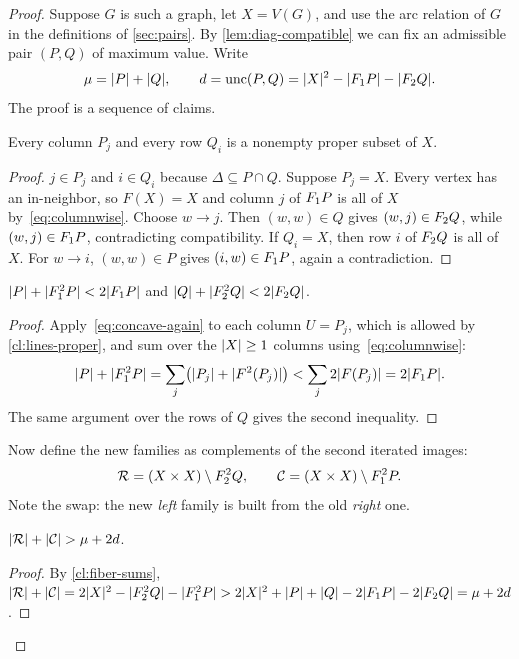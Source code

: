 \begin{proof}
Suppose $G$ is such a graph, let $X=V(G)$, and use the arc relation of $G$ in
the definitions of \cref{sec:pairs}. By \cref{lem:diag-compatible} we can fix
an admissible pair $(P,Q)$ of maximum value. Write
\[
 \mu=\lvert P\rvert+\lvert Q\rvert,\qquad d=\operatorname{unc}(P,Q)=\lvert X\rvert^2-\lvert F_1 P\rvert-\lvert F_2 Q\rvert.
\]
The proof is a sequence of claims.

\begin{claim}\label{cl:lines-proper}
Every column $P_j$ and every row $Q_i$ is a nonempty proper subset of $X$.
\end{claim}

\begin{proof}
$j\in P_j$ and $i\in Q_i$ because $\Delta\subseteq P\cap Q$. Suppose $P_j=X$. Every
vertex has an in-neighbor, so $F(X)=X$ and column $j$ of $F_1 P$ is all of
$X$ by~\eqref{eq:columnwise}. Choose $w\to j$. Then $(w,w)\in Q$ gives
$(w,j)\in F_2 Q$, while $(w,j)\in F_1 P$, contradicting compatibility. If $Q_i=X$, then
row $i$ of $F_2 Q$ is all of $X$. For $w\to i$, $(w,w)\in P$ gives $(i,w)\in F_1 P$, again a
contradiction.
\end{proof}

\begin{claim}\label{cl:fiber-sums}
$\lvert P\rvert+\lvert F_1^2P\rvert<2\lvert F_1 P\rvert$ and $\lvert Q\rvert+\lvert F_2^2Q\rvert<2\lvert F_2 Q\rvert$.
\end{claim}

\begin{proof}
Apply~\eqref{eq:concave-again} to each column $U=P_j$, which is allowed by
\cref{cl:lines-proper}, and sum over the $\lvert X\rvert\ge1$ columns
using~\eqref{eq:columnwise}:
\begin{equation}\label{eq:fiber-sum}
 \lvert P\rvert+\lvert F_1^2P\rvert=\sum_j\bigl(\lvert P_j\rvert+\lvert F^2(P_j)\rvert\bigr)<\sum_j2\lvert F(P_j)\rvert=2\lvert F_1 P\rvert.
\end{equation}
The same argument over the rows of $Q$ gives the second inequality.
\end{proof}

Now define the new families as complements of the second iterated images:
\[
 \mathcal R=(X\times X)\setminus F_2^2Q,\qquad\mathcal C=(X\times X)\setminus F_1^2P .
\]
Note the swap: the new \emph{left} family is built from the old \emph{right} one.

\begin{claim}[Gain]\label{cl:gain}
$\lvert \mathcal R\rvert+\lvert \mathcal C\rvert>\mu+2d$.
\end{claim}

\begin{proof}
By \cref{cl:fiber-sums},
$\lvert \mathcal R\rvert+\lvert \mathcal C\rvert=2\lvert X\rvert^2-\lvert F_2^2Q\rvert-\lvert F_1^2P\rvert
>2\lvert X\rvert^2+\lvert P\rvert+\lvert Q\rvert-2\lvert F_1 P\rvert-2\lvert F_2 Q\rvert=\mu+2d$.
\end{proof}


\end{proof}
